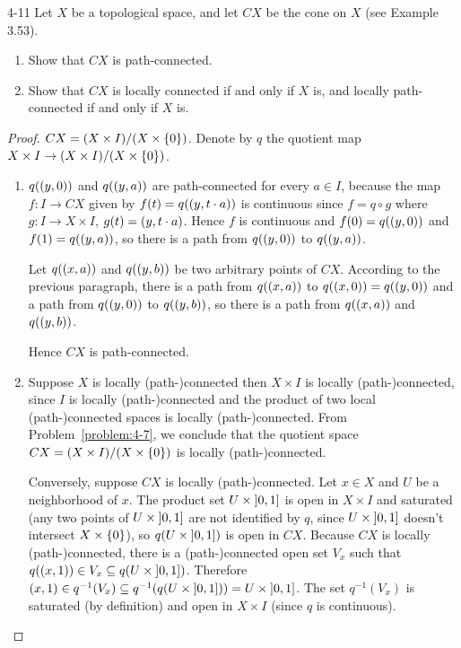 \begin{problem}{4-11}\label{problem:4-11}
Let $X$ be a topological space, and let $CX$ be the cone on $X$ (see Example 3.53).
\begin{enumerate}[label={(\alph*)}]
	\item Show that $CX$ is path-connected.
	\item Show that $CX$ is locally connected if and only if $X$ is, and locally path-connected if and only if $X$ is.
\end{enumerate}
\end{problem}

\begin{proof}
	$CX = (X \times I)/(X \times\left\{{0}\right\})$. Denote by $q$ the quotient map $X\times I \to (X \times I)/(X \times\left\{{0}\right\})$.

	\begin{enumerate}[label={(\alph*)}]
		\item $q(\left({y, 0}\right))$ and $q(\left({y, a}\right))$ are path-connected for every $a\in I$, because the map $f: I \to CX$ given by $f(t) = q(\left({y, t\cdot a}\right))$ is continuous since $f = q\circ g$ where $g: I \to X\times I$, $g(t) = \left({y, t\cdot a}\right)$. Hence $f$ is continuous and $f(0) = q(\left({y, 0}\right))$ and $f(1) = q(\left({y, a}\right))$, so there is a path from $q(\left({y, 0}\right))$ to $q(\left({y, a}\right))$.

		      Let $q(\left({x, a}\right))$ and $q(\left({y, b}\right))$ be two arbitrary points of $CX$. According to the previous paragraph, there is a path from $q(\left({x, a}\right))$ to $q(\left({x, 0}\right)) = q(\left({y, 0}\right))$ and a path from $q(\left({y, 0}\right))$ to $q(\left({y, b}\right))$, so there is a path from $q(\left({x, a}\right))$ and $q(\left({y, b}\right))$.

		      Hence $CX$ is path-connected.
		\item Suppose $X$ is locally {(path-)}connected then $X\times I$ is locally {(path-)}connected, since $I$ is locally {(path-)}connected and the product of two local {(path-)}connected spaces is locally {(path-)}connected. From Problem~\ref{problem:4-7}, we conclude that the quotient space $CX = (X\times I)/(X\times\left\{{0}\right\})$ is locally {(path-)}connected.

		      Conversely, suppose $CX$ is locally {(path-)}connected. Let $x\in X$ and $U$ be a neighborhood of $x$. The product set $U\times\left]{0, 1}\right]$ is open in $X\times I$ and saturated (any two points of $U\times\left]{0, 1}\right]$ are not identified by $q$, since $U\times\left]{0, 1}\right]$ doesn't intersect $X\times\left\{{0}\right\}$), so $q(U\times \left]{0,1}\right])$ is open in $CX$. Because $CX$ is locally {(path-)}connected, there is a {(path-)}connected open set $V_{x}$ such that $q(\left({x, 1}\right)) \in V_{x} \subseteq q(U\times \left]{0,1}\right])$. Therefore $\left({x, 1}\right) \in q^{-1}(V_{x}) \subseteq q^{-1}(q(U\times \left]{0, 1}\right])) = U\times\left]{0,1}\right]$. The set $q^{-1}(V_{x})$ is saturated (by definition) and open in $X\times I$ (since $q$ is continuous).


\end{enumerate}
\end{proof}
